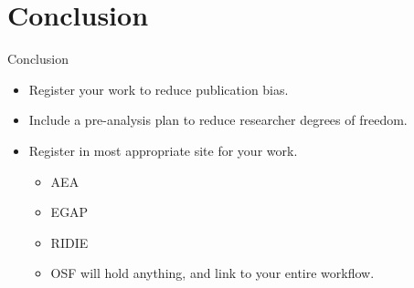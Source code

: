 \documentclass{beamer}
\begin{document}
\section{Conclusion}
\begin{frame}{Conclusion}
 \begin{itemize}
 \item
  Register your work to reduce publication bias. 
 \item
  Include a pre-analysis plan to reduce researcher degrees of freedom.
 \item
  Register in most appropriate site for your work. 
  \begin{itemize}
  \item
  AEA
  \item
  EGAP
  \item
  RIDIE
  \item
  OSF will hold anything, and link to your entire workflow.
 \end{itemize}
\end{itemize}

\end{frame}





\end{document}
